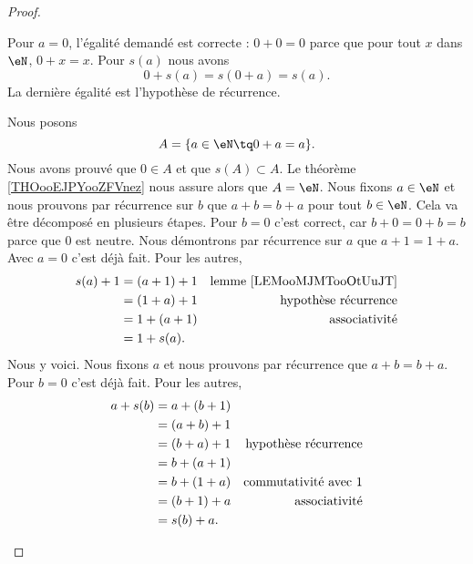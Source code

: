 \begin{proof}
\begin{subproof}
		Pour \( a=0\), l'égalité demandé est correcte : \( 0+0=0\) parce que pour tout \( x\) dans \( \eN\), \( 0+x=x\). Pour \( s(a)\) nous avons
		\begin{equation}
			0+s(a)=s(0+a)=s(a).
		\end{equation}
		La dernière égalité est l'hypothèse de récurrence.

		Nous posons
		\begin{equation}
			A=\{ a\in \eN\tq 0+a=a \}.
		\end{equation}
		Nous avons prouvé que \( 0\in A\) et que \( s(A)\subset A\). Le théorème \ref{THOooEJPYooZFVnez} nous assure alors que \( A=\eN\).
		\spitem[Commutativité]
		Nous fixons \( a\in \eN\) et nous prouvons par récurrence sur \( b\) que \( a+b=b+a\) pour tout \( b\in \eN\). Cela va être décomposé en plusieurs étapes.
		\spitem[\( a+0=0+a\)]
		Pour \( b=0\) c'est correct, car \( b+0=0+b=b\) parce que \( 0\) est neutre.
		\spitem[\( a+1=1+a\)]
		Nous démontrons par récurrence sur \( a\) que \( a+1=1+a\). Avec \( a=0\) c'est déjà fait. Pour les autres,
		\begin{subequations}
			\begin{align}
				s(a)+1 & =(a+1)+1 & \text{lemme \ref{LEMooMJMTooOtUuJT}} \\
				       & =(1+a)+1 & \text{hypothèse récurrence}          \\
				       & =1+(a+1) & \text{associativité}                 \\
				       & =1+s(a).
			\end{align}
		\end{subequations}
		\spitem[\( a+b=b+a\)]
		Nous y voici. Nous fixons \( a\) et nous prouvons par récurrence que \( a+b=b+a\). Pour \( b=0\) c'est déjà fait. Pour les autres,
		\begin{subequations}
			\begin{align}
				a+s(b) & =a+(b+1)                                    \\
				       & =(a+b)+1                                    \\
				       & =(b+a)+1 & \text{hypothèse récurrence}      \\
				       & =b+(a+1)                                    \\
				       & =b+(1+a) & \text{commutativité avec \( 1\)} \\
				       & =(b+1)+a & \text{associativité}             \\
				       & =s(b)+a.
			\end{align}

\end{subequations}
\end{subproof}
\end{proof}
